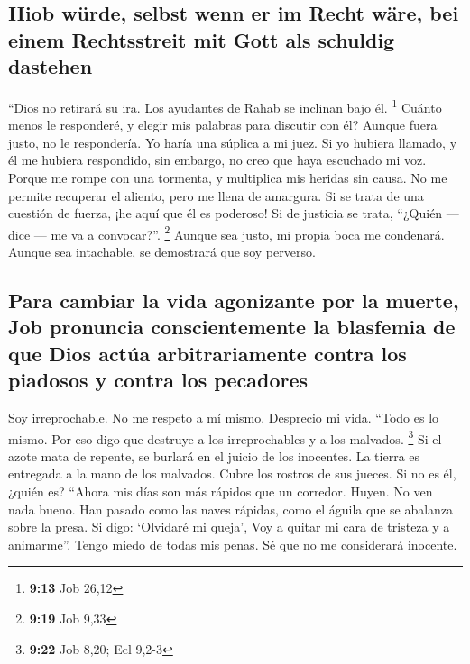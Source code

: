 \hypertarget{hiob-wuxfcrde-selbst-wenn-er-im-recht-wuxe4re-bei-einem-rechtsstreit-mit-gott-als-schuldig-dastehen}{%
\subsection{Hiob würde, selbst wenn er im Recht wäre, bei einem
Rechtsstreit mit Gott als schuldig
dastehen}\label{hiob-wuxfcrde-selbst-wenn-er-im-recht-wuxe4re-bei-einem-rechtsstreit-mit-gott-als-schuldig-dastehen}}

 ``Dios no retirará su ira. Los ayudantes de Rahab se
inclinan bajo él. \footnote{\textbf{9:13} Job 26,12} 
Cuánto menos le responderé, y elegir mis palabras para discutir con él?
 Aunque fuera justo, no le respondería. Yo haría una
súplica a mi juez.  Si yo hubiera llamado, y él me
hubiera respondido, sin embargo, no creo que haya escuchado mi voz.
 Porque me rompe con una tormenta, y multiplica mis
heridas sin causa.  No me permite recuperar el aliento,
pero me llena de amargura.  Si se trata de una cuestión
de fuerza, ¡he aquí que él es poderoso! Si de justicia se trata,
``¿Quién --- dice --- me va a convocar?''. \footnote{\textbf{9:19} Job
  9,33}  Aunque sea justo, mi propia boca me condenará.
Aunque sea intachable, se demostrará que soy perverso.

\hypertarget{para-cambiar-la-vida-agonizante-por-la-muerte-job-pronuncia-conscientemente-la-blasfemia-de-que-dios-actuxfaa-arbitrariamente-contra-los-piadosos-y-contra-los-pecadores}{%
\subsection{Para cambiar la vida agonizante por la muerte, Job pronuncia
conscientemente la blasfemia de que Dios actúa arbitrariamente contra
los piadosos y contra los
pecadores}\label{para-cambiar-la-vida-agonizante-por-la-muerte-job-pronuncia-conscientemente-la-blasfemia-de-que-dios-actuxfaa-arbitrariamente-contra-los-piadosos-y-contra-los-pecadores}}

 Soy irreprochable. No me respeto a mí mismo. Desprecio
mi vida.  ``Todo es lo mismo. Por eso digo que destruye a
los irreprochables y a los malvados. \footnote{\textbf{9:22} Job 8,20;
  Ecl 9,2-3}  Si el azote mata de repente, se burlará en
el juicio de los inocentes.  La tierra es entregada a la
mano de los malvados. Cubre los rostros de sus jueces. Si no es él,
¿quién es?  ``Ahora mis días son más rápidos que un
corredor. Huyen. No ven nada bueno.  Han pasado como las
naves rápidas, como el águila que se abalanza sobre la presa.
 Si digo: `Olvidaré mi queja', Voy a quitar mi cara de
tristeza y a animarme''.  Tengo miedo de todas mis penas.
Sé que no me considerará inocente.

